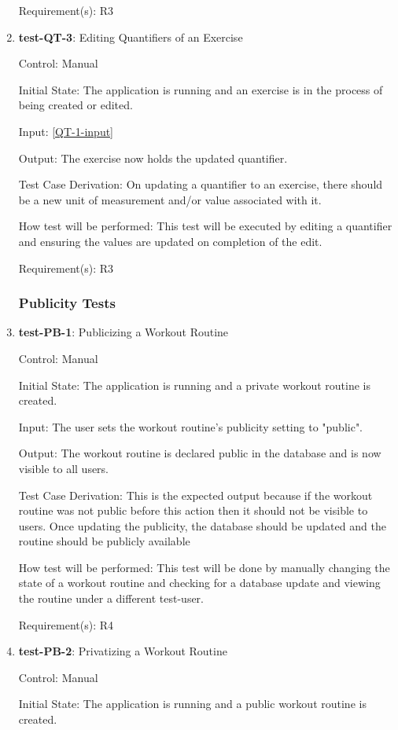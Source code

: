 \documentclass[12pt, titlepage]{article}
\begin{document}
\begin{enumerate}
		Requirement(s): R3
		\item{\textbf{test-QT-3}}: Editing Quantifiers of an Exercise
		
		Control: Manual
		
		Initial State: The application is running and an exercise is in the process of being created or edited.
		
		Input: \ref{QT-1-input}
		
		Output: The exercise now holds the updated quantifier.
		
		Test Case Derivation: On updating a quantifier to an exercise, there should be a new unit of measurement and/or value associated with it.
		
		How test will be performed: This test will be executed by editing a quantifier and ensuring the values are updated on completion of the edit.
		
		Requirement(s): R3
		
		\subsubsection{Publicity Tests}
		\item{\textbf{test-PB-1}}: Publicizing a Workout Routine
		
		Control: Manual
		
		Initial State: The application is running and a private workout routine is created.
		
		Input: The user sets the workout routine's publicity setting to "public".
		
		Output: The workout routine is declared public in the database and is now visible to all users.
		
		Test Case Derivation: This is the expected output because if the workout routine was not public before this action then it should not be visible to users. Once updating the publicity, the database should be updated and the routine should be publicly available 
		
		How test will be performed: This test will be done by manually changing the state of a workout routine and checking for a database update and viewing the routine under a different test-user.
		
		Requirement(s): R4
		
		\item{\textbf{test-PB-2}}: Privatizing a Workout Routine
		
		Control: Manual
		
		Initial State: The application is running and a public workout routine is created.
		

\end{enumerate}
\end{document}
